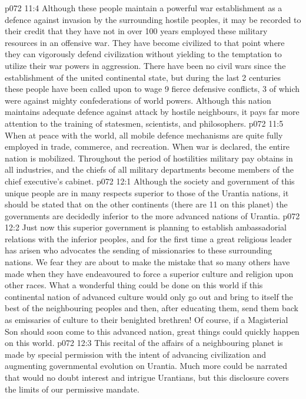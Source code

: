 \vs p072 11:4 \pc Although these people maintain a powerful war establishment as a defence against invasion by the surrounding hostile peoples, it may be recorded to their credit that they have not in over 100 years employed these military resources in an offensive war. They have become civilized to that point where they can vigorously defend civilization without yielding to the temptation to utilize their war powers in aggression. There have been no civil wars since the establishment of the united continental state, but during the last 2 centuries these people have been called upon to wage 9 fierce defensive conflicts, 3 of which were against mighty confederations of world powers. Although this nation maintains adequate defence against attack by hostile neighbours, it pays far more attention to the training of statesmen, scientists, and philosophers.
\vs p072 11:5 When at peace with the world, all mobile defence mechanisms are quite fully employed in trade, commerce, and recreation. When war is declared, the entire nation is mobilized. Throughout the period of hostilities military pay obtains in all industries, and the chiefs of all military departments become members of the chief executive’s cabinet.
\vs p072 12:1 Although the society and government of this unique people are in many respects superior to those of the Urantia nations, it should be stated that on the other continents (there are 11 on this planet) the governments are decidedly inferior to the more advanced nations of Urantia.
\vs p072 12:2 Just now this superior government is planning to establish ambassadorial relations with the inferior peoples, and for the first time a great religious leader has arisen who advocates the sending of missionaries to these surrounding nations. We fear they are about to make the mistake that so many others have made when they have endeavoured to force a superior culture and religion upon other races. What a wonderful thing could be done on this world if this continental nation of advanced culture would only go out and bring to itself the best of the neighbouring peoples and then, after educating them, send them back as emissaries of culture to their benighted brethren! Of course, if a Magisterial Son should soon come to this advanced nation, great things could quickly happen on this world.
\vs p072 12:3 \pc This recital of the affairs of a neighbouring planet is made by special permission with the intent of advancing civilization and augmenting governmental evolution on Urantia. Much more could be narrated that would no doubt interest and intrigue Urantians, but this disclosure covers the limits of our permissive mandate.
